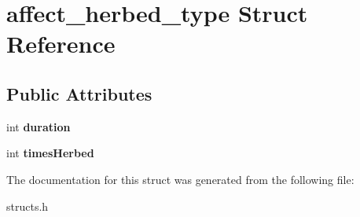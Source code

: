 \hypertarget{structaffect__herbed__type}{\section{affect\-\_\-herbed\-\_\-type Struct Reference}
\label{structaffect__herbed__type}
}
\subsection*{Public Attributes}
\begin{DoxyCompactItemize}
\item 
\hypertarget{structaffect__herbed__type_acea05e493a57044623c02995d0408b81}{int {\bfseries duration}}\label{structaffect__herbed__type_acea05e493a57044623c02995d0408b81}

\item 
\hypertarget{structaffect__herbed__type_a1537420273791ad16b7c433a7dbd1e3d}{int {\bfseries times\-Herbed}}\label{structaffect__herbed__type_a1537420273791ad16b7c433a7dbd1e3d}

\end{DoxyCompactItemize}


The documentation for this struct was generated from the following file\-:\begin{DoxyCompactItemize}
\item 
structs.\-h\end{DoxyCompactItemize}

